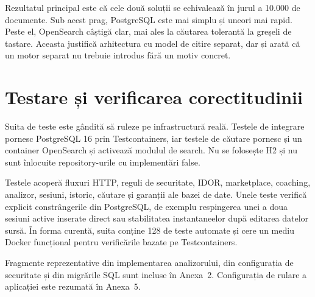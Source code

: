 Rezultatul principal este că cele două soluții se echivalează în jurul a 10.000 de documente. Sub acest
prag, PostgreSQL este mai simplu și uneori mai rapid. Peste el, OpenSearch câștigă clar, mai ales la
căutarea tolerantă la greșeli de tastare. Aceasta justifică arhitectura cu model de citire separat, dar
și arată că un motor separat nu trebuie introdus fără un motiv concret.

\section{Testare și verificarea corectitudinii}
\label{sec:testare}

Suita de teste este gândită să ruleze pe infrastructură reală. Testele de integrare pornesc PostgreSQL
16 prin Testcontainers, iar testele de căutare pornesc și un container OpenSearch și activează modulul
de search. Nu se folosește H2 și nu sunt înlocuite repository-urile cu implementări false.

Testele acoperă fluxuri HTTP, reguli de securitate, IDOR, marketplace, coaching, analizor, sesiuni,
istoric, căutare și garanții ale bazei de date. Unele teste verifică explicit constrângerile din
PostgreSQL, de exemplu respingerea unei a doua sesiuni active inserate direct sau stabilitatea
instantaneelor după editarea datelor sursă. În forma curentă, suita conține 128 de teste automate și
cere un mediu Docker funcțional pentru verificările bazate pe Testcontainers.

Fragmente reprezentative din implementarea analizorului, din configurația de securitate și din
migrările SQL sunt incluse în Anexa~2. Configurația de rulare a aplicației este rezumată în Anexa~5.
